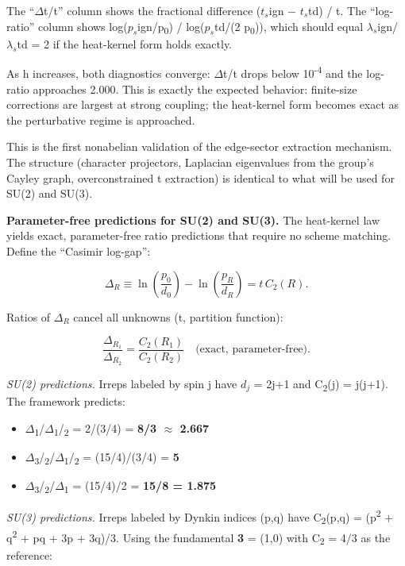 \documentclass[11pt,a4paper]{article}
\theoremstyle{remark}
\providecommand{\tightlist}{%
  \setlength{\itemsep}{0pt}\setlength{\parskip}{0pt}}
\begin{document}
The ``\ensuremath{\Delta}t/t'' column shows the fractional difference (\(t_s\)ign \ensuremath{-}
\(t_s\)td) / t. The ``log-ratio'' column shows
log(\(p_s\)ign/p\textsubscript{0}) / log(\(p_s\)td/(2 p\textsubscript{0})), which should
equal \(\ensuremath{\lambda}_s\)ign/\(\ensuremath{\lambda}_s\)td = 2 if the heat-kernel
form holds exactly.

As h increases, both diagnostics converge: \ensuremath{\Delta}t/t drops below 10\textsuperscript{-4}
and the log-ratio approaches 2.000. This is exactly the expected behavior:
finite-size corrections are largest at strong coupling; the heat-kernel form
becomes exact as the perturbative regime is approached.

This is the first nonabelian validation of the edge-sector extraction mechanism.
The structure (character projectors, Laplacian eigenvalues from the group's
Cayley graph, overconstrained t extraction) is identical to what will be used
for SU(2) and SU(3).

\textbf{Parameter-free predictions for SU(2) and SU(3).} The heat-kernel law yields
exact, parameter-free ratio predictions that require no scheme matching. Define
the ``Casimir log-gap'':

\[
\Delta_R \equiv \ln\left(\frac{p_0}{d_0}\right) - \ln\left(\frac{p_R}{d_R}\right)
= t \, C_2(R).
\]

Ratios of \(\ensuremath{\Delta}_R\) cancel all unknowns (t, partition function):

\[
\frac{\Delta_{R_1}}{\Delta_{R_2}} = \frac{C_2(R_1)}{C_2(R_2)}
\quad \text{(exact, parameter-free).}
\]

\emph{SU(2) predictions.} Irreps labeled by spin j have \(d_j\) = 2j+1 and
C\textsubscript{2}(j) = j(j+1). The framework predicts:

\begin{itemize}
\tightlist
\item
  \ensuremath{\Delta}\textsubscript{1}/\ensuremath{\Delta}\textsubscript{1}/\textsubscript{2} = 2/(3/4) = \textbf{8/3 \ensuremath{\approx} 2.667}
\item
  \ensuremath{\Delta}\textsubscript{3}/\textsubscript{2}/\ensuremath{\Delta}\textsubscript{1}/\textsubscript{2} = (15/4)/(3/4) = \textbf{5}
\item
  \ensuremath{\Delta}\textsubscript{3}/\textsubscript{2}/\ensuremath{\Delta}\textsubscript{1} = (15/4)/2 = \textbf{15/8 = 1.875}
\end{itemize}

\emph{SU(3) predictions.} Irreps labeled by Dynkin indices (p,q) have
C\textsubscript{2}(p,q) = (p\textsuperscript{2} + q\textsuperscript{2} + pq + 3p + 3q)/3. Using the fundamental \textbf{3} = (1,0)
with C\textsubscript{2} = 4/3 as the reference:
\end{document}
